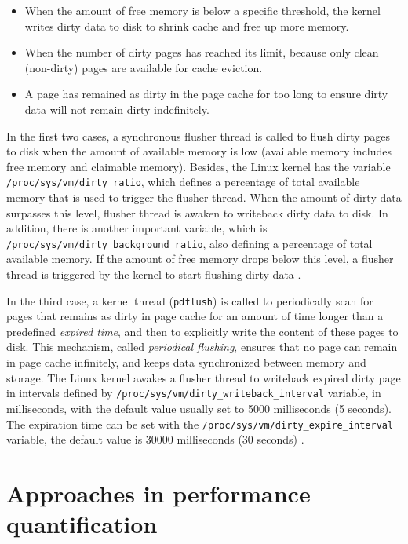 \begin{itemize}
    \item When the amount of free memory is below a specific threshold, 
     the kernel writes dirty data to disk to shrink cache and free up more memory. 
    \item When the number of dirty pages has reached its limit, because 
    only clean (non-dirty) pages are available for cache eviction.
    \item A page has remained as dirty in the page cache for too long 
    to ensure dirty data will not remain dirty indefinitely.
\end{itemize}

In the first two cases, a synchronous flusher thread is called to flush dirty pages 
to disk when the amount of available memory is low (available memory 
includes free memory and claimable memory).
Besides, the Linux kernel has the variable \texttt{/proc/sys/vm/dirty\_ratio}, 
which defines a percentage of total available memory that is used to trigger 
the flusher thread. 
When the amount of dirty data surpasses this level, flusher thread is awaken 
to writeback dirty data to disk.
In addition, there is another important variable, 
which is \texttt{/proc/sys/vm/dirty\_background\_ratio},
also defining a percentage of total available memory. 
If the amount of free memory drops below this level, a flusher thread is 
triggered by the kernel to start flushing dirty data \cite{linuxdev3rd2010}.

In the third case, a kernel thread (\texttt{pdflush}) is called to periodically 
scan for pages that remains as dirty in page cache for an amount of time 
longer than a predefined \textit{expired time}, and then to explicitly write 
the content of these pages to disk. 
This mechanism, called \textit{periodical flushing}, ensures that no page 
can remain in page cache infinitely, and keeps data synchronized between 
memory and storage.
The Linux kernel awakes a flusher thread to writeback expired dirty page in 
intervals defined by \texttt{/proc/sys/vm/dirty\_writeback\_interval} variable, 
in milliseconds, with the default value usually set to 5000 milliseconds (5 seconds). 
The expiration time can be set with the 
\texttt{/proc/sys/vm/dirty\_expire\_interval} variable, 
the default value is 30000 milliseconds (30 seconds) \cite{linuxdev3rd2010}.

\section{Approaches in performance quantification}
\label{sec:approaches}

